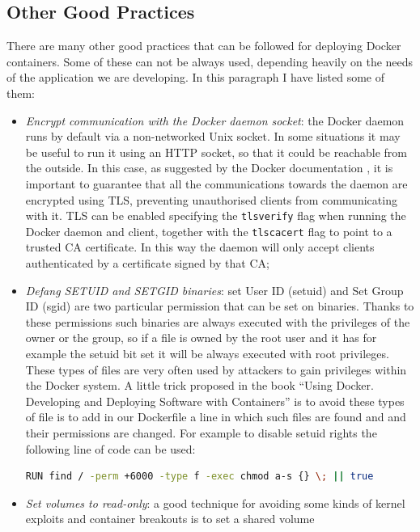 \documentclass[a4paper,12pt]{article}
\newcommand{\code}[1]{\lstinline|#1|}
\begin{document}
\subsection{Other Good Practices}

There are many other good practices that can be followed for deploying Docker
containers. Some of these can not be always used, depending heavily on the needs
of the application we are developing. In this paragraph I have listed some of
them:
\begin{itemize}
  \item \textit{Encrypt communication with the Docker daemon socket}: the Docker
  daemon runs by default via a non-networked Unix socket. In some situations it
  may be useful to run it using an HTTP socket, so that it could be reachable
  from the outside. In this case, as suggested by the Docker documentation
  \cite{docker_TLS}, it is important to guarantee that all the communications
  towards the daemon are encrypted using TLS, preventing unauthorised clients
  from communicating with it. TLS can be enabled specifying the \code{tlsverify}
  flag when running the Docker daemon and client, together with the
  \code{tlscacert} flag to point to a trusted CA certificate. In this way the
  daemon will only accept clients authenticated by a certificate signed by that
  CA;
  \item \textit{Defang SETUID and SETGID binaries}: set User ID (setuid) and Set
  Group ID (sgid) are two particular permission that can be set on binaries.
  Thanks to these permissions such binaries are always executed with the
  privileges of the owner or the group, so if a file is owned by the root user
  and it has for example the setuid bit set it will be always executed with root
  privileges. These types of files are very often used by attackers to gain
  privileges within the Docker system. A little trick proposed in the book
  ``Using Docker. Developing and Deploying Software with Containers''
  \cite[Sec.~13]{mouat_using_docker} is to avoid these types of file is to add
  in our Dockerfile a line in which such files are found and and their
  permissions are changed. For example to disable setuid rights the following
  line of code can be used:
  \begin{lstlisting}[language=bash,breaklines]
    RUN find / -perm +6000 -type f -exec chmod a-s {} \; || true
  \end{lstlisting}
  \item \textit{Set volumes to read-only}: a good technique for avoiding some
  kinds of kernel exploits and container breakouts is to set a shared volume

\end{itemize}
\end{document}
